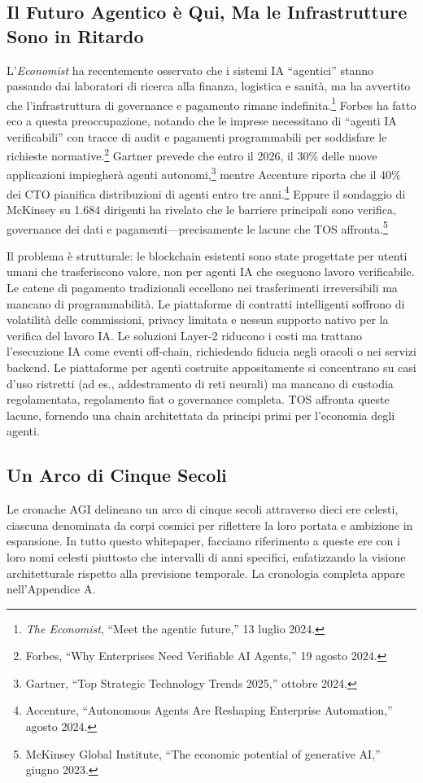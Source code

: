 \documentclass[11pt]{article}
\begin{document}
\subsection{Il Futuro Agentico è Qui, Ma le Infrastrutture Sono in Ritardo}
L'\emph{Economist} ha recentemente osservato che i sistemi IA ``agentici'' stanno passando dai laboratori di ricerca alla finanza, logistica e sanità, ma ha avvertito che l'infrastruttura di governance e pagamento rimane indefinita.\footnote{\emph{The Economist}, ``Meet the agentic future,'' 13 luglio 2024.} Forbes ha fatto eco a questa preoccupazione, notando che le imprese necessitano di ``agenti IA verificabili'' con tracce di audit e pagamenti programmabili per soddisfare le richieste normative.\footnote{Forbes, ``Why Enterprises Need Verifiable AI Agents,'' 19 agosto 2024.} Gartner prevede che entro il 2026, il 30\% delle nuove applicazioni impiegherà agenti autonomi,\footnote{Gartner, ``Top Strategic Technology Trends 2025,'' ottobre 2024.} mentre Accenture riporta che il 40\% dei CTO pianifica distribuzioni di agenti entro tre anni.\footnote{Accenture, ``Autonomous Agents Are Reshaping Enterprise Automation,'' agosto 2024.} Eppure il sondaggio di McKinsey su 1.684 dirigenti ha rivelato che le barriere principali sono verifica, governance dei dati e pagamenti---precisamente le lacune che TOS affronta.\footnote{McKinsey Global Institute, ``The economic potential of generative AI,'' giugno 2023.}

Il problema è strutturale: le blockchain esistenti sono state progettate per utenti umani che trasferiscono valore, non per agenti IA che eseguono lavoro verificabile. Le catene di pagamento tradizionali eccellono nei trasferimenti irreversibili ma mancano di programmabilità. Le piattaforme di contratti intelligenti soffrono di volatilità delle commissioni, privacy limitata e nessun supporto nativo per la verifica del lavoro IA. Le soluzioni Layer-2 riducono i costi ma trattano l'esecuzione IA come eventi off-chain, richiedendo fiducia negli oracoli o nei servizi backend. Le piattaforme per agenti costruite appositamente si concentrano su casi d'uso ristretti (ad es., addestramento di reti neurali) ma mancano di custodia regolamentata, regolamento fiat o governance completa. TOS affronta queste lacune, fornendo una chain architettata da principi primi per l'economia degli agenti.

\subsection{Un Arco di Cinque Secoli}
Le cronache AGI delineano un arco di cinque secoli attraverso dieci ere celesti, ciascuna denominata da corpi cosmici per riflettere la loro portata e ambizione in espansione. In tutto questo whitepaper, facciamo riferimento a queste ere con i loro nomi celesti piuttosto che intervalli di anni specifici, enfatizzando la visione architetturale rispetto alla previsione temporale. La cronologia completa appare nell'Appendice A.
\end{document}
